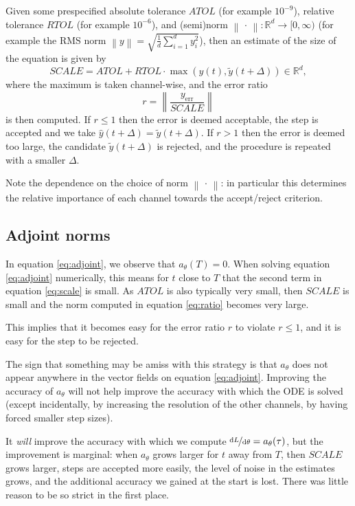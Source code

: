 \documentclass{article}
\theoremstyle{plain}
\theoremstyle{definition}
\newcommand{\norm}[1]{\left\|#1\right\|}
\newcommand{\reals}{\mathbb{R}}
\newcommand{\dd}{\mathrm{d}}
\begin{document}
Given some prespecified absolute tolerance $ATOL$ (for example $10^{-9}$), relative tolerance $RTOL$ (for example $10^{-6}$), and (semi)norm $\norm{\,\cdot\,} \colon \reals^d \to [0, \infty)$ (for example the RMS norm $\norm{y} = \sqrt{\frac{1}{d} \sum_{i = 1}^d y_i^2}$), then an estimate of the size of the equation is given by
\begin{equation}\label{eq:scale}
SCALE = ATOL + RTOL \cdot \max(\widehat{y}(t), \widetilde{y}(t + \Delta)) \in \reals^d,
\end{equation}
where the maximum is taken channel-wise, and the error ratio
\begin{equation}\label{eq:ratio}
r = \norm{\frac{y_\text{err}}{SCALE}}
\end{equation}
is then computed. If $r \leq 1$ then the error is deemed acceptable, the step is accepted and we take $\widehat{y}(t + \Delta) = \widetilde{y}(t + \Delta)$. If $r > 1$ then the error is deemed too large, the candidate $\widetilde{y}(t + \Delta)$ is rejected, and the procedure is repeated with a smaller $\Delta$.

Note the dependence on the choice of norm $\norm{\,\cdot\,}$: in particular this determines the relative importance of each channel towards the accept/reject criterion.

\subsection{Adjoint norms}
In equation \eqref{eq:adjoint}, we observe that $a_\theta(T) = 0$. When solving equation \eqref{eq:adjoint} numerically, this means for $t$ close to $T$ that the second term in equation \eqref{eq:scale} is small. As $ATOL$ is also typically very small, then $SCALE$ is small and the norm computed in equation \eqref{eq:ratio} becomes very large.

This implies that it becomes easy for the error ratio $r$ to violate $r \leq 1$, and it is easy for the step to be rejected.

The sign that something may be amiss with this strategy is that $a_\theta$ does not appear anywhere in the vector fields on equation \eqref{eq:adjoint}. Improving the accuracy of $a_\theta$ will not help improve the accuracy with which the ODE is solved (except incidentally, by increasing the resolution of the other channels, by having forced smaller step sizes).

It \emph{will} improve the accuracy with which we compute $\nicefrac{\dd L}{\dd \theta} = a_\theta(\tau)$, but the improvement is marginal: when $a_\theta$ grows larger for $t$ away from $T$, then $SCALE$ grows larger, steps are accepted more easily, the level of noise in the estimates grows, and the additional accuracy we gained at the start is lost. There was little reason to be so strict in the first place.
\end{document}
